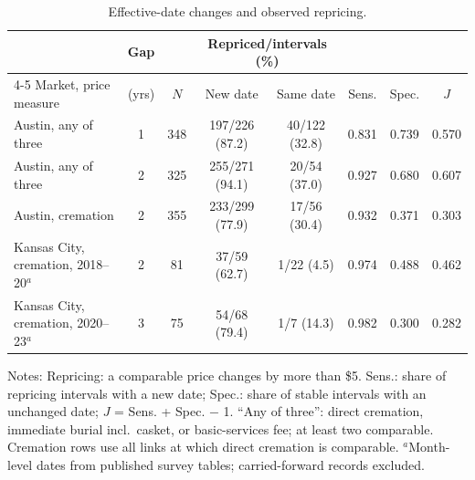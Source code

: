 \begin{table}[t]
\centering\footnotesize
\caption{Effective-date changes and observed repricing.}\label{tab:signal}
\setlength{\tabcolsep}{2.5pt}\scriptsize
\begin{tabular*}{\textwidth}{@{\extracolsep{\fill}}lccccccc@{}}
\toprule
 & Gap & & \multicolumn{2}{c}{Repriced/intervals (\%)} & & & \\
\cmidrule(lr){4-5}
Market, price measure & (yrs) & $N$ & New date & Same date & Sens. & Spec. & $J$ \\
\midrule
Austin, any of three & 1 & 348 & 197/226 (87.2) & 40/122 (32.8) & 0.831 & 0.739 & 0.570 \\
Austin, any of three & 2 & 325 & 255/271 (94.1) & 20/54 (37.0) & 0.927 & 0.680 & 0.607 \\
Austin, cremation & 2 & 355 & 233/299 (77.9) & 17/56 (30.4) & 0.932 & 0.371 & 0.303 \\
Kansas City, cremation, 2018--20$^{a}$ & 2 & 81 & 37/59 (62.7) & 1/22 (4.5) & 0.974 & 0.488 & 0.462 \\
Kansas City, cremation, 2020--23$^{a}$ & 3 & 75 & 54/68 (79.4) & 1/7 (14.3) & 0.982 & 0.300 & 0.282 \\
\bottomrule
\end{tabular*}
\begin{minipage}{\textwidth}\vspace{3pt}\scriptsize
Notes: Repricing: a comparable price changes by more than \$5. Sens.: share of repricing intervals with a new date; Spec.: share of stable intervals with an unchanged date; $J$ = Sens. + Spec. $-$ 1. ``Any of three'': direct cremation, immediate burial incl.~casket, or basic-services fee; at least two comparable. Cremation rows use all links at which direct cremation is comparable. $^{a}$Month-level dates from published survey tables; carried-forward records excluded.
\end{minipage}
\end{table}
